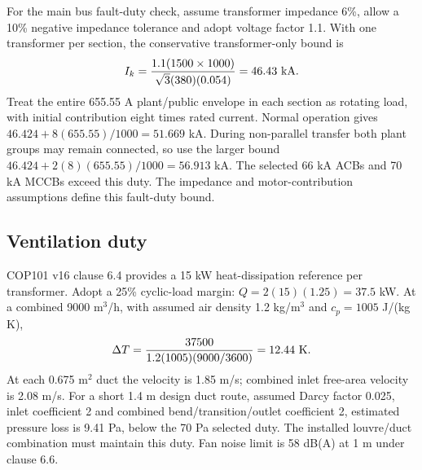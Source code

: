 For the main bus fault-duty check, assume transformer impedance 6\%, allow a 10\% negative impedance tolerance and adopt voltage factor 1.1. With one transformer per section, the conservative transformer-only bound is
\[
I_{k}=\frac{1.1(1500\times1000)}{\sqrt3(380)(0.054)}=46.43\ {\rm kA}.
\]
Treat the entire 655.55 A plant/public envelope in each section as rotating load, with initial contribution eight times rated current. Normal operation gives $46.424+8(655.55)/1000=51.669$ kA. During non-parallel transfer both plant groups may remain connected, so use the larger bound $46.424+2(8)(655.55)/1000=56.913$ kA. The selected 66 kA ACBs and 70 kA MCCBs exceed this duty. The impedance and motor-contribution assumptions define this fault-duty bound.

\subsection*{Ventilation duty}
COP101 v16 clause 6.4 provides a 15 kW heat-dissipation reference per transformer. Adopt a 25\% cyclic-load margin: $Q=2(15)(1.25)=37.5$ kW. At a combined 9000 m$^3$/h, with assumed air density 1.2 kg/m$^3$ and $c_p=1005$ J/(kg K),
\[
\Delta T=\frac{37500}{1.2(1005)(9000/3600)}=12.44\ {\rm K}.
\]
At each 0.675 m$^2$ duct the velocity is 1.85 m/s; combined inlet free-area velocity is 2.08 m/s. For a short 1.4 m design duct route, assumed Darcy factor 0.025, inlet coefficient 2 and combined bend/transition/outlet coefficient 2, estimated pressure loss is 9.41 Pa, below the 70 Pa selected duty. The installed louvre/duct combination must maintain this duty. Fan noise limit is 58 dB(A) at 1 m under clause 6.6.
